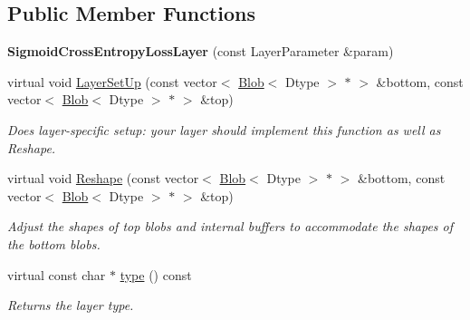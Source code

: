\subsection*{Public Member Functions}
\begin{DoxyCompactItemize}
\item 
{\bfseries Sigmoid\+Cross\+Entropy\+Loss\+Layer} (const Layer\+Parameter \&param)\hypertarget{classcaffe_1_1SigmoidCrossEntropyLossLayer_a3b4478b3d5c5130de685b240b274c06c}{}\label{classcaffe_1_1SigmoidCrossEntropyLossLayer_a3b4478b3d5c5130de685b240b274c06c}

\item 
virtual void \hyperlink{classcaffe_1_1SigmoidCrossEntropyLossLayer_a87a48fa111fae84f238259d77263459e}{Layer\+Set\+Up} (const vector$<$ \hyperlink{classcaffe_1_1Blob}{Blob}$<$ Dtype $>$ $\ast$ $>$ \&bottom, const vector$<$ \hyperlink{classcaffe_1_1Blob}{Blob}$<$ Dtype $>$ $\ast$ $>$ \&top)
\begin{DoxyCompactList}\small\item\em Does layer-\/specific setup\+: your layer should implement this function as well as Reshape. \end{DoxyCompactList}\item 
virtual void \hyperlink{classcaffe_1_1SigmoidCrossEntropyLossLayer_a81e7895b53040e8d56d03b5f52a9453f}{Reshape} (const vector$<$ \hyperlink{classcaffe_1_1Blob}{Blob}$<$ Dtype $>$ $\ast$ $>$ \&bottom, const vector$<$ \hyperlink{classcaffe_1_1Blob}{Blob}$<$ Dtype $>$ $\ast$ $>$ \&top)
\begin{DoxyCompactList}\small\item\em Adjust the shapes of top blobs and internal buffers to accommodate the shapes of the bottom blobs. \end{DoxyCompactList}\item 
virtual const char $\ast$ \hyperlink{classcaffe_1_1SigmoidCrossEntropyLossLayer_a2a8e622af3f7d96694cb70432629f606}{type} () const \hypertarget{classcaffe_1_1SigmoidCrossEntropyLossLayer_a2a8e622af3f7d96694cb70432629f606}{}\label{classcaffe_1_1SigmoidCrossEntropyLossLayer_a2a8e622af3f7d96694cb70432629f606}

\begin{DoxyCompactList}\small\item\em Returns the layer type. \end{DoxyCompactList}\end{DoxyCompactItemize}
